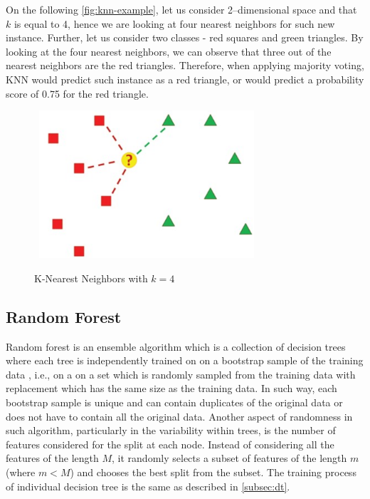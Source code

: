 On the following \autoref{fig:knn-example}, let us consider 2--dimensional space and that $k$ is equal to 4, hence we are looking at four nearest neighbors for such new instance. Further, let us consider two classes - red squares and green triangles.
By looking at the four nearest neighbors, we can observe that three out of the nearest neighbors are the red triangles.
Therefore, when applying majority voting, KNN would predict such instance as a red triangle, or would predict a probability score of 0.75 for the red triangle.

\begin{figure}[H]
    \centering
    \caption{K-Nearest Neighbors with $k=4$}\vspace{0.5em}
    \label{fig:knn-example}\
    \includegraphics[width=80mm]{Figures/KNN_example.jpg}

    \vspace{-1em}
\end{figure}
\subsection{Random Forest}

Random forest is an ensemble algorithm which is a collection of decision trees where each tree is independently trained on on a bootstrap sample of the training data \citep{han2011data}, i.e., on a on a set which is randomly sampled from the training data with replacement which has the same size as the training data. In such way, each bootstrap sample is unique and can contain duplicates of the original data or does not have to contain all the original data.
Another aspect of randomness in such algorithm, particularly in the variability within trees, is the number of features considered for the split at each node.
Instead of considering all the features of the length $M$, it randomly selects a subset of features of the length $m$ (where $m<M$) and chooses the best split from the subset.
The training process of individual decision tree is the same as described in \autoref{subsec:dt}.

